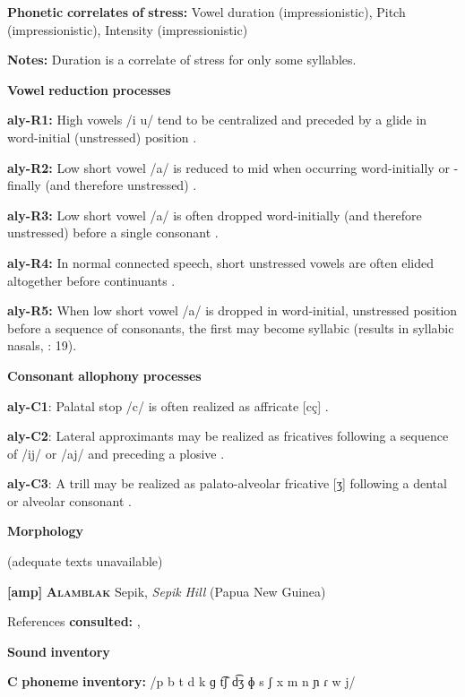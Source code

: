 \textbf{Phonetic} \textbf{correlates} \textbf{of} \textbf{stress:} Vowel duration (impressionistic), Pitch (impressionistic), Intensity (impressionistic)

\textbf{Notes:} Duration is a correlate of stress for only some syllables.

\textbf{Vowel} \textbf{reduction} \textbf{processes}

\textbf{aly-R1:} High vowels /i u/ tend to be centralized and preceded by a glide in word-initial (unstressed) position \citep[25]{Yallop1977}.

\textbf{aly-R2:} Low short vowel /a/ is reduced to mid when occurring word-initially or -finally (and therefore unstressed) \citep[25]{Yallop1977}.

\textbf{aly-R3:} Low short vowel /a/ is often dropped word-initially (and therefore unstressed) before a single consonant \citep[28]{Yallop1977}.

\textbf{aly-R4:} In normal connected speech, short unstressed vowels are often elided altogether before continuants \citep[27]{Yallop1977}.

\textbf{aly-R5:} When low short vowel /a/ is dropped in word-initial, unstressed position before a sequence of consonants, the first may become syllabic (results in syllabic nasals, \citealt{Yallop1977}: 19).

\textbf{Consonant} \textbf{allophony} \textbf{processes}

\textbf{aly-C1}: Palatal stop /c/ is often realized as affricate [cç] \citep[21]{Yallop1977}.

\textbf{aly-C2}: Lateral approximants may be realized as fricatives following a sequence of /ij/ or /aj/ and preceding a plosive \citep[19]{Yallop1977}.

\textbf{aly-C3}: A trill may be realized as palato-alveolar fricative [ʒ] following a dental or alveolar consonant \citep[19]{Yallop1977}.

\textbf{Morphology}

(adequate texts unavailable)

\textbf{[amp]}   \textbf{\textsc{Alamblak}}  Sepik, \textit{Sepik} \textit{Hill} (Papua New Guinea)

References \textbf{consulted:} \citet{Bruce1984}, \citet{EdmistonEdmiston2003}

\textbf{Sound} \textbf{inventory}

\textbf{C} \textbf{phoneme} \textbf{inventory:} /p b t d k ɡ t͡ʃ d͡ʒ ɸ s ʃ x m n ɲ ɾ w j/

